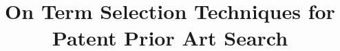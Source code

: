 \documentclass{sig-alternate}
\begin{document}
%

\title{On Term Selection Techniques for Patent Prior Art Search
}
%
%
%
%
%
\end{document}
